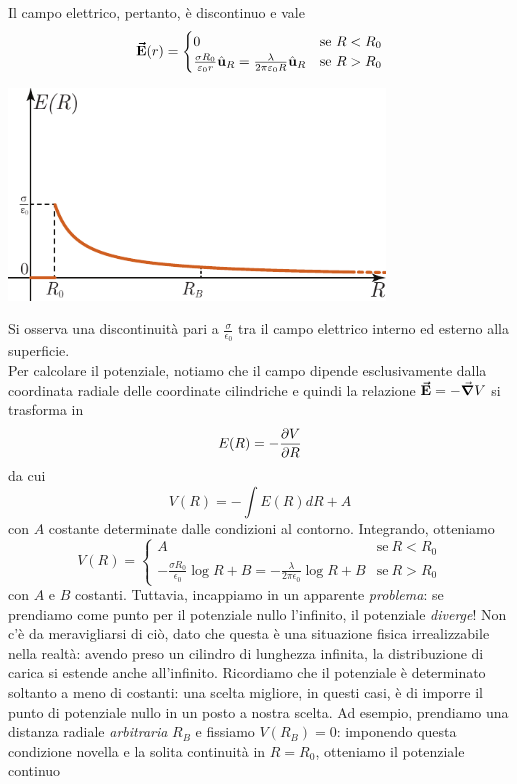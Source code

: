 Il campo elettrico, pertanto, è discontinuo e vale
\begin{equation}
	\vb*{\va{E}}(r)=\begin{cases}
		0&\text{se}\ R< R_0\\
		\frac{\sigma R_0}{\varepsilon_0r}\hat{\mathbf{u}}_R=\frac{\lambda}{2\pi\varepsilon_0 R}\hat{\mathbf{u}}_R &\text{se}\ R> R_0
	\end{cases}
\end{equation}
\begin{center}
	\includegraphics[width=0.75\textwidth]{images/chp3cilindrograf1.pdf}
\end{center}
Si osserva una discontinuità pari a $\frac{\sigma}{\epsilon_0}$ tra il campo elettrico interno ed esterno alla superficie.\\
Per calcolare il potenziale, notiamo che il campo dipende esclusivamente dalla coordinata radiale delle coordinate cilindriche e quindi la relazione $\vb*{\va{E}}=-\grad{V}$ si trasforma in
\begin{equation*}
	E(R)=-\pdv{V}{R}
\end{equation*}
da cui
\begin{equation*}
	V(R)=-\int E(R)dR+A
\end{equation*}
con $A$ costante determinate dalle condizioni al contorno. Integrando, otteniamo
\begin{equation*}
	V(R)=
	\begin{cases}
		A&\text{se}\ R< R_0\\
		-\frac{\sigma R_0}{\epsilon_0}\log R + B=-\frac{\lambda}{2\pi\epsilon_0}\log R + B&\text{se}\ R> R_0
	\end{cases}
\end{equation*}
con $A$ e $B$ costanti. Tuttavia, incappiamo in un apparente \textit{problema}: se prendiamo come punto per il potenziale nullo l'infinito, il potenziale \textit{diverge}! Non c'è da meravigliarsi di ciò, dato che questa è una situazione fisica irrealizzabile nella realtà: avendo preso un cilindro di lunghezza infinita, la distribuzione di carica si estende anche all'infinito. Ricordiamo che il potenziale è determinato soltanto a meno di costanti: una scelta migliore, in questi casi, è di imporre il punto di potenziale nullo in un posto a nostra scelta. Ad esempio, prendiamo una distanza radiale \textit{arbitraria} $R_{B}$ e fissiamo $V(R_B)=0$: imponendo questa condizione novella e la solita continuità in $R=R_0$, otteniamo il potenziale continuo
